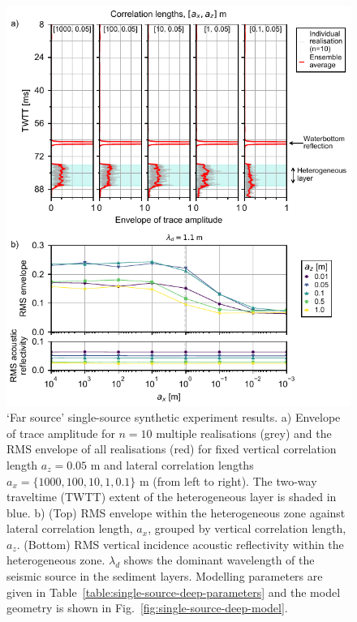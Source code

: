 \documentclass[se,manuscript]{copernicus}
\begin{document}
\begin{figure}
    \includegraphics{figures/si_fig12.pdf}
    \caption{`Far source' single-source synthetic experiment results.
        a) Envelope of trace amplitude for $n=10$ multiple realisations (grey) and the RMS envelope of all realisations (red) for fixed vertical correlation length $a_z=0.05$ m and lateral correlation lengths $a_x=\{1000, 100, 10, 1, 0.1\}$ \unit{m} (from left to right).
        The two-way traveltime (TWTT) extent of the heterogeneous layer is shaded in blue.
        b) (Top) RMS envelope within the heterogeneous zone against lateral correlation length, $a_x$, grouped by vertical correlation length, $a_z$.
        (Bottom) RMS vertical incidence acoustic reflectivity within the heterogeneous zone.
        $\lambda_d$ shows the dominant wavelength of the seismic source in the sediment layers.
        Modelling parameters are given in Table~\ref{table:single-source-deep-parameters} and the model geometry is shown in Fig.~\ref{fig:single-source-deep-model}.}
    \label{fig:single-source-deep-results} 
\end{figure}

\clearpage
\end{document}
